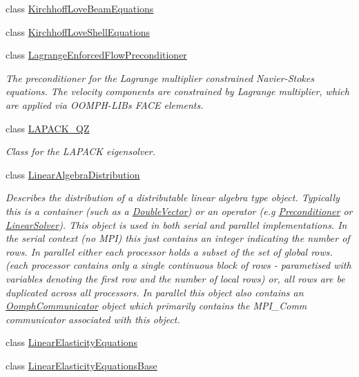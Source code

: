 \begin{DoxyCompactItemize}
class \hyperlink{classoomph_1_1KirchhoffLoveBeamEquations}{Kirchhoff\+Love\+Beam\+Equations}
\item 
class \hyperlink{classoomph_1_1KirchhoffLoveShellEquations}{Kirchhoff\+Love\+Shell\+Equations}
\item 
class \hyperlink{classoomph_1_1LagrangeEnforcedFlowPreconditioner}{Lagrange\+Enforced\+Flow\+Preconditioner}
\begin{DoxyCompactList}\small\item\em The preconditioner for the Lagrange multiplier constrained Navier-\/\+Stokes equations. The velocity components are constrained by Lagrange multiplier, which are applied via O\+O\+M\+P\+H-\/\+L\+IB\textquotesingle{}s F\+A\+CE elements. \end{DoxyCompactList}\item 
class \hyperlink{classoomph_1_1LAPACK__QZ}{L\+A\+P\+A\+C\+K\+\_\+\+QZ}
\begin{DoxyCompactList}\small\item\em Class for the L\+A\+P\+A\+CK eigensolver. \end{DoxyCompactList}\item 
class \hyperlink{classoomph_1_1LinearAlgebraDistribution}{Linear\+Algebra\+Distribution}
\begin{DoxyCompactList}\small\item\em Describes the distribution of a distributable linear algebra type object. Typically this is a container (such as a \hyperlink{classoomph_1_1DoubleVector}{Double\+Vector}) or an operator (e.\+g \hyperlink{classoomph_1_1Preconditioner}{Preconditioner} or \hyperlink{classoomph_1_1LinearSolver}{Linear\+Solver}). This object is used in both serial and parallel implementations. In the serial context (no M\+PI) this just contains an integer indicating the number of rows. In parallel either each processor holds a subset of the set of global rows. (each processor contains only a single continuous block of rows -\/ parametised with variables denoting the first row and the number of local rows) or, all rows are be duplicated across all processors. In parallel this object also contains an \hyperlink{classoomph_1_1OomphCommunicator}{Oomph\+Communicator} object which primarily contains the M\+P\+I\+\_\+\+Comm communicator associated with this object. \end{DoxyCompactList}\item 
class \hyperlink{classoomph_1_1LinearElasticityEquations}{Linear\+Elasticity\+Equations}
\item 
class \hyperlink{classoomph_1_1LinearElasticityEquationsBase}{Linear\+Elasticity\+Equations\+Base}

\end{DoxyCompactItemize}
